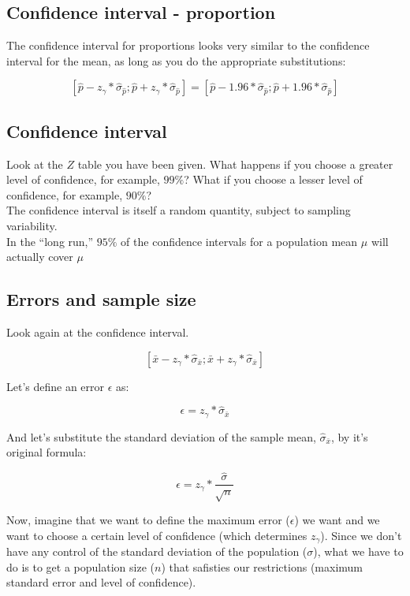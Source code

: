 \documentclass[11pt]{article}
\begin{document}
	\subsection*{Confidence interval - proportion}
	
	The confidence interval for proportions looks very similar to the confidence interval for the mean, as long as you do the appropriate substitutions:
	
	\[[\hat{p}-z_\gamma*\hat{\sigma}_{\hat{p}};\hat{p}+z_\gamma*\hat{\sigma}_{\hat{p}}]=[\hat{p}-1.96*\hat{\sigma}_{\hat{p}};\hat{p}+1.96*\hat{\sigma}_{\hat{p}}]\]

	\subsection*{Confidence interval}
	
	Look at the $Z$ table you have been given. What happens if you choose a greater level of confidence, for example, $99\%$? What if you choose a lesser level of confidence, for example, $90\%$?\\

The confidence interval is itself a random quantity, subject to sampling variability.\\

In the “long run,” $95\%$ of the confidence intervals for a population mean $\mu$ will actually cover $\mu$

	\subsection*{Errors and sample size}

	Look again at the confidence interval.

	\[[\bar{x}-z_\gamma*\hat{\sigma}_{\bar{x}};\bar{x}+z_\gamma*\hat{\sigma}_{\bar{x}}]\]

	Let's define an error $\epsilon$ as:
	
	\[\epsilon=z_\gamma*\hat{\sigma}_{\bar{x}}\]	
	
	And let's substitute the standard deviation of the sample mean, $\hat{\sigma}_{\bar{x}}$, by it's original formula:
	
	\[\epsilon=z_\gamma*\frac{\hat{\sigma}}{\sqrt{n}}\]	

Now, imagine that we want to define the maximum error ($\epsilon$) we want and we want to choose a certain level of confidence (which determines $z_\gamma$). Since we don't have any control of the standard deviation of the population ($\sigma$), what we have to do is to get a population size ($n$) that safisties our restrictions (maximum standard error and level of confidence).
\end{document}
